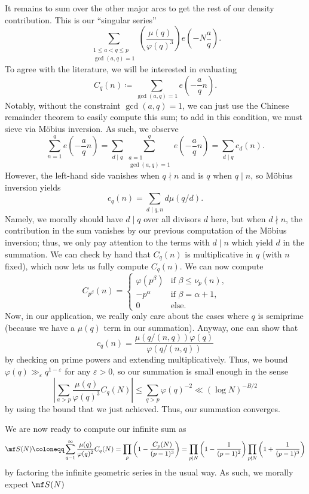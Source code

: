 \documentclass[../notes.tex]{subfiles}
\begin{document}
It remains to sum over the other major arcs to get the rest of our density contribution. This is our ``singular series''
\[\sum_{\substack{1\le a<q\le p\\\gcd(a,q)=1}}\left(\frac{\mu(q)}{\varphi(q)^3}\right)e\left(-N\frac aq\right).\]
To agree with the literature, we will be interested in evaluating
\[C_q(n)\coloneqq\sum_{\gcd(a,q)=1}e\left(-\frac aqn\right).\]
Notably, without the constraint $\gcd(a,q)=1$, we can just use the Chinese remainder theorem to easily compute this sum; to add in this condition, we must sieve via M\"obius inversion. As such, we observe
\[\sum_{n=1}^qe\left(-\frac aqn\right)=\sum_{d\mid q}\sum_{\substack{a=1\\\gcd(a,q)=1}}^qe\left(-\frac aqn\right)=\sum_{d\mid q}c_d(n).\]
However, the left-hand side vanishes when $q\nmid n$ and is $q$ when $q\mid n$, so M\"obius inversion yields
\[c_q(n)=\sum_{d\mid q,n}d\mu(q/d).\]
Namely, we morally should have $d\mid q$ over all divisors $d$ here, but when $d\nmid n$, the contribution in the sum vanishes by our previous computation of the M\"obius inversion; thus, we only pay attention to the terms with $d\mid n$ which yield $d$ in the summation. We can check by hand that $C_q(n)$ is multiplicative in $q$ (with $n$ fixed), which now lets us fully compute $C_q(n)$. We can now compute
\[C_{p^\beta}(n)=\begin{cases}
	\varphi\left(p^\beta\right) & \text{if }\beta\le\nu_p(n), \\
	-p^\alpha & \text{if }\beta=\alpha+1, \\
	0 & \text{else}.
\end{cases}\]
Now, in our application, we really only care about the cases where $q$ is semiprime (because we have a $\mu(q)$ term in our summation). Anyway, one can show that
\[c_q(n)=\frac{\mu(q/(n,q))\varphi(q)}{\varphi(q/(n,q))}\]
by checking on prime powers and extending multiplicatively. Thus, we bound $\varphi(q)\gg_\varepsilon q^{1-\varepsilon}$ for any $\varepsilon>0$, so our summation is small enough in the sense
\[\left|\sum_{a>p}\frac{\mu(q)}{\varphi(q)^3}C_q(N)\right|\le\sum_{q>p}\varphi(q)^{-2}\ll(\log N)^{-B/2}\]
by using the bound that we just achieved. Thus, our summation converges.

We are now ready to compute our infinite sum as
\[\mf S(N)\coloneqq\sum_{q-1}^\infty\frac{\mu(q)}{\varphi(q)^2}C_q(N)=\prod_p\left(1-\frac{C_p(N)}{(p-1)^3}\right)=\prod_{p\mid N}\left(1-\frac1{(p-1)^2}\right)\prod_{p\nmid N}\left(1+\frac1{(p-1)^3}\right)\]
by factoring the infinite geometric series in the usual way. As such, we morally expect $\mf S(N)$
\end{document}
